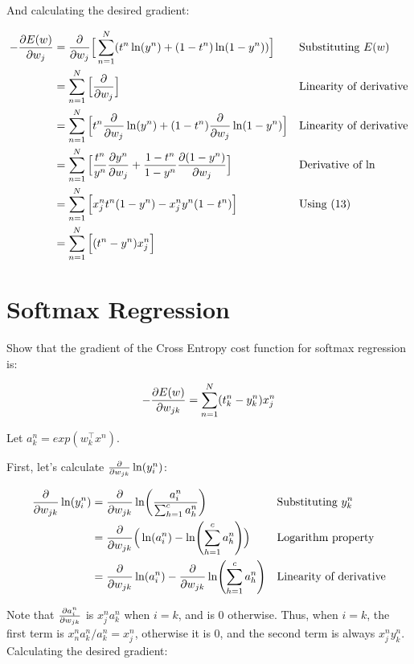 \documentclass{article} %
\begin{document}
And calculating the desired gradient:

\begin{align}
  - \pdv{E(w)}{w_j}
  &= \pdv{}{w_j} \Big[\sum_{n=1}^{N}(t^n \ln(y^n) + (1 - t^n) \ln(1 - y^n))\Big]
  && \text{Substituting $E(w)$}\\
  &= \sum_{n=1}^{N} \Big[\pdv{}{w_j} (t^n \ln(y^n) + (1 - t^n) \ln(1 - y^n))\Big]
  && \text{Linearity of derivative}\\
  &= \sum_{n=1}^{N} \Big[t^n \pdv{}{w_j}\ln(y^n) + (1 - t^n) \pdv{}{w_j} \ln(1 - y^n)\Big]
  && \text{Linearity of derivative}\\
  &= \sum_{n=1}^{N} \Big[\frac{t^n}{y^n} \pdv{y^n}{w_j} + \frac{1 - t^n}{1 - y^n} \pdv{(1 - y^n)}{w_j}\Big]
  && \text{Derivative of ln}\\
  &= \sum_{n=1}^{N} \Big[x_j^n t^n (1 - y^n) - x_j^n y^n (1 - t^n)\Big]
  && \text{Using (13)}\\
  &= \sum_{n=1}^{N} \Big[(t^n - y^n)x_j^n\Big]
\end{align}

\section{Softmax Regression}

Show that the gradient of the Cross Entropy cost function for softmax regression
is:

\[
- \pdv{E(w)}{w_{jk}} = \sum_{n=1}^{N}(t_k^n - y_k^n)x_j^n
\]

Let $a_k^n = exp(w_k^\top x^n)$.

First, let's calculate $\pdv{}{w_{jk}}\ln(y_i^n)$:

\begin{align}
  \pdv{}{w_{jk}} \ln(y_i^n)
  &= \pdv{}{w_{jk}} \ln(\frac{a_i^n}{\sum_{h=1}^c a_h^n})
  && \text{Substituting $y_k^n$}\\
  &= \pdv{}{w_{jk}} \Big(\ln(a_i^n) - \ln(\sum_{h=1}^c a_h^n)\Big)
  && \text{Logarithm property}\\
  &= \pdv{}{w_{jk}} \ln(a_i^n) - \pdv{}{w_{jk}} \ln(\sum_{h=1}^c a_h^n)
  && \text{Linearity of derivative}
\end{align}

Note that $\pdv{a_i^n}{w_{jk}}$ is $x_j^n a_k^n$ when $i = k$, and is 0
otherwise. Thus, when $i = k$, the first term is $x_n^n a_k^n / a_k^n = x_j^n$,
otherwise it is $0$, and the second term is always $x_j^n y_k^n$.\\

Calculating the desired gradient:
\end{document}
